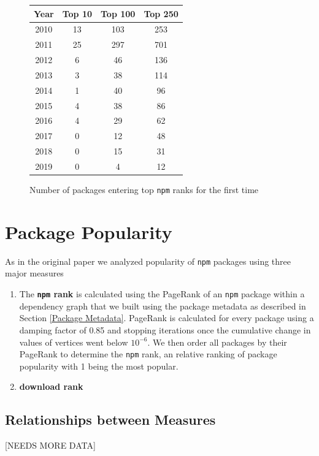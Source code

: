 \documentclass[10pt,conference]{IEEEtran}
\def\code#1{\texttt{#1}}
\begin{document}
\begin{figure}
  \begin{tabular}{c|c|c|c}
    Year & Top 10 & Top 100 & Top 250 \\
    \hline
    2010 & 13 & 103 & 253\\
    2011 & 25 & 297 & 701\\
    2012 & 6 & 46 & 136\\
    2013 & 3 & 38 & 114\\
    2014 & 1 & 40 & 96\\
    2015 & 4 & 38 & 86\\
    2016 & 4 & 29 & 62\\
    2017 & 0 & 12 & 48\\
    2018 & 0 & 15 & 31\\
    2019 & 0 & 4 & 12\\
  \end{tabular}
  \caption{Number of packages entering top \code{npm} ranks for the first time}
  \label{numEnteringTop}
\end{figure}

\section{Package Popularity}

As in the original paper we analyzed popularity of \code{npm} packages using three major measures
\begin{enumerate}
  \item The \textbf{\code{npm} rank} is calculated using the PageRank\cite{brin1998anatomy} of an \code{npm} package within a dependency graph that we built using the
    package metadata as described in Section \ref{Package Metadata}. PageRank is calculated for every package using a damping factor of 0.85 
    and stopping iterations once the cumulative change in values of vertices went below $10^{-6}$. We then order all packages by their PageRank to determine the
    \code{npm} rank, an relative ranking of package popularity with 1 being the most popular.
  \item \textbf{download rank}
\end{enumerate}


\subsection{Relationships between Measures}
[NEEDS MORE DATA]
\end{document}
